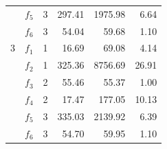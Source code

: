 \documentclass[12pt]{article}
\begin{document}
\begin{table}[H]
\begin{tabular}{llrrrr}
                & $f_5$ &       3 &   297.41 &      1975.98 &              6.64 \\
                & $f_6$ &       3 &    54.04 &        59.68 &              1.10 \\
                \midrule
                3 & $f_1$ &       1 &    16.69 &        69.08 &              4.14 \\
                & $f_2$ &       1 &   325.36 &      8756.69 &             26.91 \\
                & $f_3$ &       2 &    55.46 &        55.37 &              1.00 \\
                & $f_4$ &       2 &    17.47 &       177.05 &             10.13 \\
                & $f_5$ &       3 &   335.03 &      2139.92 &              6.39 \\
                & $f_6$ &       3 &    54.70 &        59.95 &              1.10 \\
                \bottomrule
            \end{tabular}
        \end{table}

    \appendix
    
    
    
\end{document}

